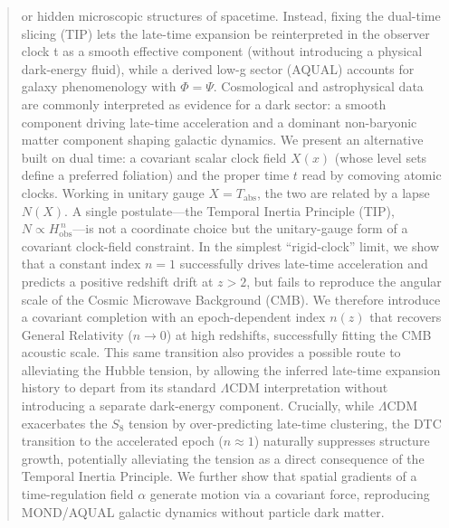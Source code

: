 \documentclass[12pt]{article}
\begin{document}
\begin{abstract}
or hidden microscopic structures of spacetime. Instead, fixing the dual-time slicing
(TIP) lets the late-time expansion be reinterpreted in the observer clock t as a smooth
effective component (without introducing a physical dark-energy fluid), while a derived
low-g sector (AQUAL) accounts for galaxy phenomenology with $\Phi = \Psi$. Cosmological and astrophysical data are commonly interpreted as evidence for a dark sector: a smooth component driving late-time acceleration and a dominant non-baryonic matter component shaping galactic dynamics. We present an alternative built on dual time: a covariant scalar clock field $X(x)$ (whose level sets define a preferred foliation) and the proper time $t$ read by comoving atomic clocks. Working in unitary gauge $X=T_{\mathrm{abs}}$, the two are related by a lapse $N(X)$. A single postulate---the Temporal Inertia Principle (TIP), $N \propto H_{\mathrm{obs}}^{\,n}$---is not a coordinate choice but the unitary-gauge form of a covariant clock-field constraint. In the simplest ``rigid-clock'' limit, we show that a constant index $n=1$ successfully drives late-time acceleration and predicts a positive redshift drift at $z>2$, but fails to reproduce the angular scale of the Cosmic Microwave Background (CMB). We therefore introduce a covariant completion with an epoch-dependent index $n(z)$ that recovers General Relativity ($n\rightarrow 0$) at high redshifts, successfully fitting the CMB acoustic scale. This same transition also provides a possible route to alleviating the Hubble tension, by allowing the inferred late-time expansion history to depart from its standard $\Lambda$CDM interpretation without introducing a separate dark-energy component. Crucially, while $\Lambda$CDM exacerbates the $S_8$ tension by over-predicting late-time clustering, the DTC transition to the accelerated epoch ($n\approx 1$) naturally suppresses structure growth, potentially alleviating the tension as a direct consequence of the Temporal Inertia Principle. We further show that spatial gradients of a time-regulation field $\alpha$ generate motion via a covariant force, reproducing MOND/AQUAL galactic dynamics without particle dark matter.

\end{abstract}
\vspace{0.8em}

\end{document}

